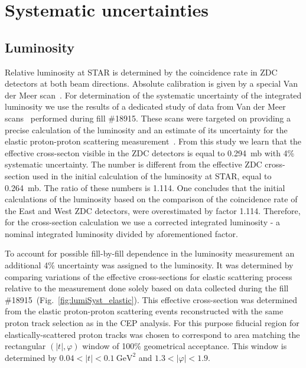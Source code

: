 

\chapter{Systematic uncertainties}\label{chap:systematicErrors} 

\section{Luminosity}\label{sec:lumiSyst}
Relative luminosity at STAR is determined by the coincidence rate in ZDC detectors at both beam directions. Absolute calibration is given by a special Van der Meer scan~\cite{vanderMeer}. For determination of the systematic uncertainty of the integrated luminosity we use the results of a dedicated study of data from Van der Meer scans~\cite{lumiNote} performed during fill \#18915. These scans were targeted on providing a precise calculation of the luminosity and an estimate of its uncertainty for the elastic proton-proton scattering measurement~\cite{elasticNote}. From this study we learn that the effective cross-secton visible in the ZDC detectors is equal to 0.294~mb with 4\% systematic uncertainty. The number is different from the effective ZDC cross-section used in the initial calculation of the luminosity at STAR, equal to 0.264~mb. The ratio of these numbers is 1.114. One concludes that the initial calculations of the luminosity based on the comparison of the coincidence rate of the East and West ZDC detectors, were overestimated by factor 1.114. Therefore, for the cross-section calculation we use a corrected integrated luminosity - a nominal integrated luminosity divided by aforementioned factor.

\indent
To account for possible fill-by-fill dependence in the luminosity measurement an additional 4\% uncertainty was assigned to the luminosity. It was determined by comparing variations of the effective cross-sections for elastic scattering process relative to the measurement done solely based on data collected during the fill \#18915~(Fig.~\ref{fig:lumiSyst_elastic}). This effective cross-section was determined from the elastic proton-proton scattering events reconstructed with the same proton track selection as in the CEP analysis. For this purpose fiducial region for elastically-scattered proton tracks was chosen to correspond to area matching the rectangular $(|t|, \varphi)$ window of 100\% geometrical acceptance. This window is determined by $0.04 < |t| < 0.1~\text{GeV}^{2}$ and $1.3<|\varphi|<1.9$.

